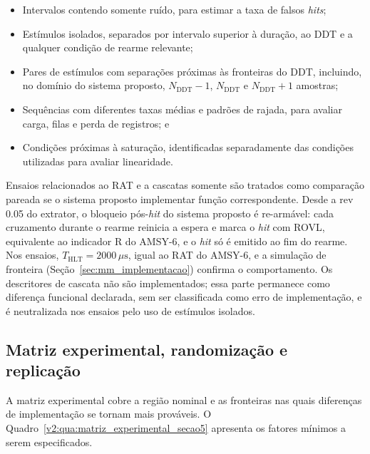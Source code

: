 \begin{itemize}
	\item Intervalos contendo somente ruído, para estimar a taxa de falsos \textit{hits};
	
	\item Estímulos isolados, separados por intervalo superior à duração, ao DDT e a qualquer condição de rearme relevante;
	
	\item Pares de estímulos com separações próximas às fronteiras do DDT, incluindo, no domínio do sistema proposto, \(N_{\mathrm{DDT}}-1\), \(N_{\mathrm{DDT}}\) e \(N_{\mathrm{DDT}}+1\) amostras;
	
	\item Sequências com diferentes taxas médias e padrões de rajada, para avaliar carga, filas e perda de registros; e
	
	\item Condições próximas à saturação, identificadas separadamente das condições utilizadas para avaliar linearidade.
\end{itemize}

Ensaios relacionados ao RAT e a cascatas somente são tratados como comparação pareada se o sistema proposto implementar função correspondente. Desde a rev 0.05 do extrator, o bloqueio pós-\textit{hit} do sistema proposto é re-armável: cada cruzamento durante o rearme reinicia a espera e marca o \textit{hit} com ROVL, equivalente ao indicador R do AMSY-6, e o \textit{hit} só é emitido ao fim do rearme. Nos ensaios, \(T_{\mathrm{HLT}} = 2000\,\mu\mathrm{s}\), igual ao RAT do AMSY-6, e a simulação de fronteira (Seção~\ref{sec:mm_implementacao}) confirma o comportamento. Os descritores de cascata não são implementados; essa parte permanece como diferença funcional declarada, sem ser classificada como erro de implementação, e é neutralizada nos ensaios pelo uso de estímulos isolados.

\subsection{Matriz experimental, randomização e replicação}
\label{v2:subsec:matriz_experimental}

A matriz experimental cobre a região nominal e as fronteiras nas quais diferenças de implementação se tornam mais prováveis. O Quadro~\ref{v2:qua:matriz_experimental_secao5} apresenta os fatores mínimos a serem especificados.


